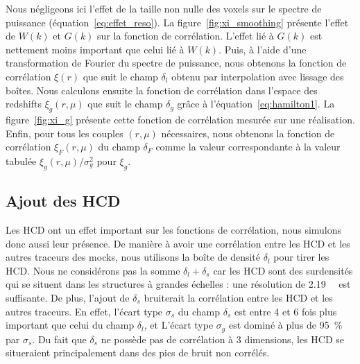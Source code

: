 Nous négligeons ici l'effet de la taille non nulle des voxels sur le spectre de puissance (équation~\ref{eq:effet_reso}).
La figure~\ref{fig:xi_smoothing} présente l'effet de $W(k)$ et $G(k)$ sur la fonction de corrélation. L'effet lié à $G(k)$ est nettement moins important que celui lié à $W(k)$.
Puis, à l'aide d'une transformation de Fourier du spectre de puissance, nous obtenons la fonction de corrélation $\xi(r)$ que suit le champ $\delta_l$ obtenu par interpolation avec lissage des boîtes.
Nous calculons ensuite la fonction de corrélation dans l'espace des redshifts $\xi_g(r, \mu)$ que suit le champ $\delta_g$ grâce à l'équation~\ref{eq:hamilton1}. La figure~\ref{fig:xi_g} présente cette fonction de corrélation mesurée sur une réalisation. Enfin, pour tous les couples $(r,\mu)$ nécessaires, nous obtenons la fonction de corrélation $\xi_F(r, \mu)$ du champ $\delta_F$ comme la valeur correspondante à la valeur tabulée $\xi_g(r, \mu) / \sigma_g^2$ pour $\xi_g$.



\subsection{Ajout des HCD}
\label{subsec:hcd}
Les HCD ont un effet important sur les fonctions de corrélation, nous simulons donc aussi leur présence. De manière à avoir une corrélation entre les HCD et les autres traceurs des mocks, nous utilisons la boîte de densité $\delta_l$ pour tirer les HCD. Nous ne considérons pas la somme $\delta_l + \delta_s$ car les HCD sont des surdensités qui se situent dans les structures à grandes échelles : une résolution de \SI{2.19}{\perh\Mpc} est suffisante. De plus, l'ajout de $\delta_s$ bruiterait la corrélation entre les HCD et les autres traceurs. En effet, l'écart type $\sigma_s$ du champ $\delta_s$ est entre 4 et 6 fois plus important que celui du champ $\delta_l$, et L'écart type $\sigma_g$ est dominé à plus de \SI{95}{\percent} par $\sigma_s$. Du fait que $\delta_s$ ne possède pas de corrélation à 3 dimensions, les HCD se situeraient principalement dans des pics de bruit non corrélés.


